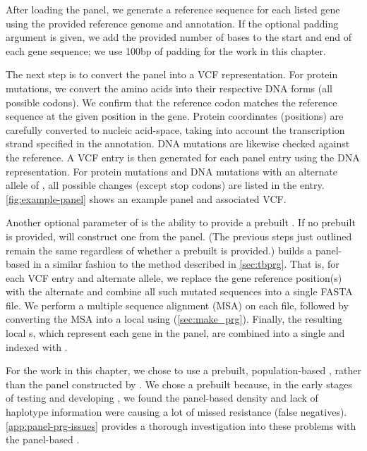 After loading the panel, we generate a reference sequence for each listed gene using the provided reference genome and annotation. If the optional padding argument is given, we add the provided number of bases to the start and end of each gene sequence; we use 100bp of padding for the work in this chapter.

The next step is to convert the panel into a VCF representation. For protein mutations, we convert the amino acids into their respective DNA forms (all possible codons). We confirm that the reference codon matches the reference sequence at the given position in the gene. Protein coordinates (positions) are carefully converted to nucleic acid-space, taking into account the transcription strand specified in the annotation. DNA mutations are likewise checked against the reference. A VCF entry is then generated for each panel entry using the DNA representation. For protein mutations and DNA mutations with an alternate allele of , all possible changes (except stop codons) are listed in the entry. \autoref{fig:example-panel} shows an example panel and associated VCF.

Another optional parameter of \drprg{}  is the ability to provide a prebuilt \panrg{}. If no prebuilt \panrg{} is provided, \drprg{} will construct one from the panel. (The previous steps just outlined remain the same regardless of whether a prebuilt \panrg{} is provided.) \drprg{} builds a panel-based \panrg{} in a similar fashion to the method described in \autoref{sec:tbprg}. That is, for each VCF entry and alternate allele, we replace the gene reference position(s) with the alternate and combine all such mutated sequences into a single FASTA file. We perform a multiple sequence alignment (MSA) on each file, followed by converting the MSA into a local \prg{} using \makeprg{} (\autoref{sec:make_prg}). Finally, the resulting local \prg{}s, which represent each gene in the panel, are combined into a single \panrg{} and indexed with \pandora{}.

For the work in this chapter, we chose to use a prebuilt, population-based \panrg{}, rather than the panel \panrg{} constructed by \drprg{}. We chose a prebuilt \panrg{} because, in the early stages of testing and developing \drprg{}, we found the panel-based \panrg{} density and lack of haplotype information were causing a lot of missed resistance (false negatives). \autoref{app:panel-prg-issues} provides a thorough investigation into these problems with the panel-based \panrg{}.


